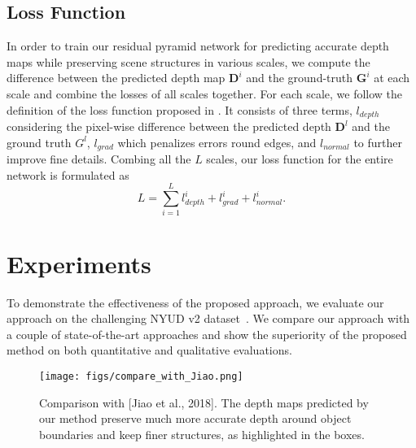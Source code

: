\documentclass{article}
\newcommand{\pD}{\mathbf{D}}
\begin{document}
\subsection{Loss Function}
\label{sec:implementation}

In order to train our residual pyramid network for predicting accurate depth maps while preserving scene structures in various scales, we compute the difference between the predicted depth map $\pD^{i}$ and the ground-truth $\mathbf{G}^i$ at each scale and combine the losses of all scales together. 
For each scale, we follow the definition of the loss function proposed in \cite{hu2019revisiting}. 
It consists of three terms, $l_{depth}$ considering the pixel-wise difference between the predicted depth $\pD^{l}$ and the ground truth $G^{l}$, $l_{grad}$ which penalizes errors round edges, and $l_{normal}$ to further improve fine details. 
Combing all the $L$ scales, our loss function for the entire network is formulated as 
\begin{equation}
L = \sum_{i=1}^L {l_{depth}^i + l_{grad}^i +  l_{normal}^i}.
\end{equation}











 	\section{Experiments}
\label{sec:results}


To demonstrate the effectiveness of the proposed approach, we evaluate our approach on the challenging NYUD v2 dataset~\cite{silberman2012indoor}. We compare our approach with a couple of state-of-the-art approaches and show the superiority of the proposed method on both quantitative and qualitative evaluations.

\begin{figure}[ht]
	\centering
	\texttt{[image: figs/compare\_with\_Jiao.png]}
	\caption{Comparison with [Jiao et al., 2018]. The depth maps predicted by our method preserve much more accurate depth around object boundaries and keep finer structures, as highlighted in the boxes. }
	\label{fig:compare-jiao}
\end{figure}
\end{document}
